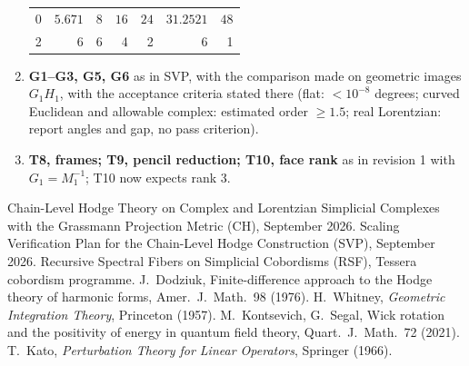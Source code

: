 \documentclass[11pt]{article}
\theoremstyle{definition}
\theoremstyle{plain}
\theoremstyle{remark}
\begin{document}
\begin{enumerate}[leftmargin=2em]
\begin{center}\footnotesize
\begin{tabular}{@{}rrrrrrr@{}}
\toprule
\(0\) & \(5.671\) & \(8\) & \(16\) & \(24\) & \(31.2521\) & \(48\) \\
2 & 6 & 6 & 4 & 2 & 6 & 1 \\
\bottomrule
\end{tabular}
\end{center}
\item \textbf{G1--G3, G5, G6} as in SVP, with the comparison made on geometric images \(G_1H_1\), with the acceptance criteria stated there (flat: \(<10^{-8}\) degrees; curved Euclidean and allowable complex: estimated order \(\ge1.5\); real Lorentzian: report angles and gap, no pass criterion).
\item \textbf{T8, frames; T9, pencil reduction; T10, face rank} as in revision 1 with \(G_1=M_1^{-1}\); T10 now expects rank 3.
\end{enumerate}

\begin{thebibliography}{9}\small
{} Chain-Level Hodge Theory on Complex and Lorentzian Simplicial Complexes with the Grassmann Projection Metric (CH), September 2026.
 Scaling Verification Plan for the Chain-Level Hodge Construction (SVP), September 2026.
 Recursive Spectral Fibers on Simplicial Cobordisms (RSF), Tessera cobordism programme.
 J.~Dodziuk, Finite-difference approach to the Hodge theory of harmonic forms, Amer.\ J.\ Math.\ 98 (1976).
 H.~Whitney, \emph{Geometric Integration Theory}, Princeton (1957).
 M.~Kontsevich, G.~Segal, Wick rotation and the positivity of energy in quantum field theory, Quart.\ J.\ Math.\ 72 (2021).
 T.~Kato, \emph{Perturbation Theory for Linear Operators}, Springer (1966).
\end{thebibliography}
\end{document}

